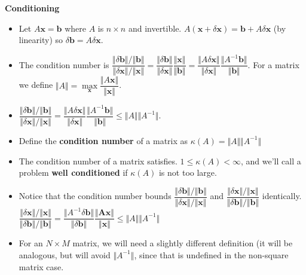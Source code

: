\documentclass[12pt,letterpaper,noanswers]{exam}
\newcommand{\vc}[1]{\boldsymbol{#1}}
\begin{document}
\noindent\textbf{Conditioning}
\begin{tcolorbox}
\begin{itemize}
\itemsep0pt
\item Let $A\vc{x} = \vc{b}$ where $A$ is $n\times n$ and invertible.  $A(\vc{x} + \delta\vc{x}) = \vc{b} + A\delta\vc{x}$ (by linearity) so $\delta\vc{b} = A\delta\vc{x}$.
    \item The condition number is $\dfrac{\Vert \delta \vc{b}\Vert/\Vert\vc{b}\Vert}{\Vert \delta \vc{x}\Vert/\Vert\vc{x}\Vert} = \dfrac{\Vert \delta \vc{b}\Vert}{\Vert\delta\vc{x}\Vert}\dfrac{\Vert \vc{x}\Vert}{\Vert\vc{b}\Vert} = \dfrac{\Vert A\delta \vc{x}\Vert}{\Vert\delta\vc{x}\Vert}\dfrac{\Vert A^{-1}\vc{b}\Vert}{\Vert\vc{b}\Vert}$.  For a matrix we define $\Vert A\Vert = \max\limits_{\vc{x}}\dfrac{\Vert A\vc{x}\Vert}{\Vert\vc{x}\Vert}$.
   \end{itemize} 
 \end{tcolorbox}   
 \begin{tcolorbox}
   \begin{itemize}
\itemsep0pt
   \item  $\dfrac{\Vert \delta \vc{b}\Vert/\Vert\vc{b}\Vert}{\Vert \delta \vc{x}\Vert/\Vert\vc{x}\Vert} = \dfrac{\Vert A\delta \vc{x}\Vert}{\Vert\delta\vc{x}\Vert}\dfrac{\Vert A^{-1}\vc{b}\Vert}{\Vert\vc{b}\Vert}\leq \Vert A\Vert \Vert A^{-1}\Vert$.
   \item  Define the \textbf{condition number} of a matrix as $\kappa(A) =\Vert A\Vert\Vert A^{-1}\Vert$
   \item The condition number of a matrix satisfies.  $1\leq \kappa(A) < \infty$, and we'll call a problem \textbf{well conditioned} if $\kappa(A)$ is not too large.
   \item  Notice that the condition number bounds  $\dfrac{\Vert \delta \vc{b}\Vert/\Vert\vc{b}\Vert}{\Vert \delta \vc{x}\Vert/\Vert\vc{x}\Vert}$ and $\dfrac{\Vert \delta \vc{x}\Vert/\Vert\vc{x}\Vert}{\Vert \delta \vc{b}\Vert/\Vert\vc{b}\Vert}$ identically.  $ \dfrac{\Vert \delta \vc{x}\Vert/\Vert\vc{x}\Vert}{\Vert \delta \vc{b}\Vert/\Vert\vc{b}\Vert}= \dfrac{\Vert A^{-1}\delta \vc{b}\Vert}{\Vert \delta\vc{b}\Vert}\dfrac{\Vert \vc{Ax}\Vert}{\Vert\vc{x}\Vert}\leq \Vert A\Vert \Vert A^{-1}\Vert$
   \item For an $N\times M$ matrix, we will need a slightly different definition (it will be analogous, but will avoid $\Vert A^{-1}\Vert$, since that is undefined in the non-square matrix case.
\end{itemize}
 \end{tcolorbox}



\end{document}
